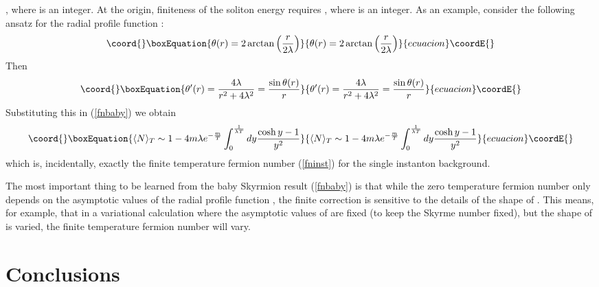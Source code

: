 \documentclass[a4paper,prd]{revtex4}
\begin{document}
\coordHE{}, where \coordHE{} is an integer. At the origin,
finiteness of the soliton energy requires \coordHE{}, where \coordHE{} is
an integer. As an example, consider the
following ansatz for the radial profile function
\coordHE{}:
\begin{equation}\coord{}\boxEquation{
\theta(r)=2\arctan \left(\frac{r}{2 \lambda}\right)
\label{ansatz}
}{
\theta(r)=2\arctan \left(\frac{r}{2 \lambda}\right)
}{ecuacion}\coordE{}\end{equation}
Then 
\begin{equation}\coord{}\boxEquation{
\theta^{\prime}(r)=\frac{4 \lambda}{r^{2} +4
\lambda^{2}}=\frac{\sin \theta(r)}{r}
}{
\theta^{\prime}(r)=\frac{4 \lambda}{r^{2} +4
\lambda^{2}}=\frac{\sin \theta(r)}{r}
}{ecuacion}\coordE{}\end{equation} 
Substituting this in (\ref{fnbaby}) we obtain
\begin{equation}\coord{}\boxEquation{
\langle N \rangle _{T} \sim 1 - 
4 m \lambda e^{-\frac{m}{T}} \int_{0}^{\frac{1}{\lambda T}}dy 
\frac{\cosh y -1}{y^{2}}
}{
\langle N \rangle _{T} \sim 1 - 
4 m \lambda e^{-\frac{m}{T}} \int_{0}^{\frac{1}{\lambda T}}dy 
\frac{\cosh y -1}{y^{2}}
}{ecuacion}\coordE{}\end{equation}
which is, incidentally, exactly the finite temperature fermion number
(\ref{fninst}) for the \coordHE{} single instanton background.

The most important thing to be learned from the baby Skyrmion result
(\ref{fnbaby}) is that while the zero temperature fermion number \coordHE{} only depends on the asymptotic values of the radial profile
function \coordHE{}, the finite \coordHE{} correction is sensitive to the
details of the shape of \coordHE{}. This means, for example, that in a
variational calculation where the asymptotic values of \coordHE{} are
fixed (to keep the Skyrme number fixed), but the shape of \coordHE{} is
varied, the finite temperature fermion number will vary.





\section{Conclusions}
\end{document}
